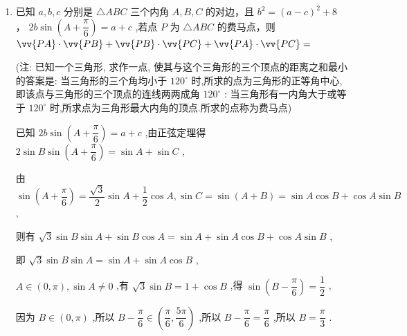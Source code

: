 \begin{enumerate}
\begin{jieda}
\begin{enumerate}
            又因为 ${9a} + {4c} = {25}$ ,
            
            则 $\dfrac{\sqrt{3}}{BD} = \dfrac{1}{25}\left( {{9a} + {4c}}\right) \left( {\dfrac{1}{a} + \dfrac{1}{c}}\right)  = \dfrac{1}{25}\left( {{13} + \dfrac{4c}{a} + \dfrac{9a}{c}}\right)  \geq  \dfrac{1}{25}\left( {{13} + 2\sqrt{\dfrac{4c}{a} \cdot  \dfrac{9a}{c}}}\right)  = 1$ ,
            
            当且仅当 $\dfrac{4c}{a} = \dfrac{9a}{c}$ ,即 $a = \dfrac{5}{3},c = \dfrac{5}{2}$ 时取等号,
            
            可得 ${BD} \leq  \sqrt{3}$ ，所以 ${BD}$ 的最大值为 $\sqrt{3}$ .
        \end{enumerate}
    \end{jieda}
    \item 已知 $a,b,c$ 分别是 $\bigtriangleup  {ABC}$ 三个内角 $A,B,C$ 的对边，且 ${b}^{2} = {\left( a - c\right) }^{2} + 8$ ， ${2b}\sin \left( {A + \dfrac{\pi }{6}}\right)  = a + c$ ,若点 $P$ 为 $\bigtriangleup  {ABC}$ 的费马点，则 $\vv{PA} \cdot  \vv{PB} + \vv{PB} \cdot  \vv{PC} + \vv{PA} \cdot  \vv{PC} =$
    
    (注: 已知一个三角形, 求作一点, 使其与这个三角形的三个顶点的距离之和最小的答案是: 当三角形的三个角均小于 ${120}^{ \circ  }$ 时,所求的点为三角形的正等角中心,即该点与三角形的三个顶点的连线两两成角 ${120}^{ \circ  }$ : 当三角形有一内角大于或等于 ${120}^{ \circ  }$ 时,所求点为三角形最大内角的顶点.所求的点称为费马点)
    \begin{jieda}
        已知 ${2b}\sin \left( {A + \dfrac{\pi }{6}}\right)  = a + c$ ,由正弦定理得 $2\sin B\sin \left( {A + \dfrac{\pi }{6}}\right)  = \sin A + \sin C$ ,
        
        由 $\sin \left( {A + \dfrac{\pi }{6}}\right)  = \dfrac{\sqrt{3}}{2}\sin A + \dfrac{1}{2}\cos A,\sin C = \sin \left( {A + B}\right)  = \sin A\cos B + \cos A\sin B$ ,
        
        则有 $\sqrt{3}\sin B\sin A + \sin B\cos A = \sin A + \sin A\cos B + \cos A\sin B$ ,
        
        即 $\sqrt{3}\sin B\sin A = \sin A + \sin A\cos B$ ,
        
        $A \in  \left( {0,\pi }\right) ,\sin A \neq  0$ ,有 $\sqrt{3}\sin B = 1 + \cos B$ ,得 $\sin \left( {B - \dfrac{\pi }{6}}\right)  = \dfrac{1}{2}$ ,
        
        因为 $B \in  \left( {0,\pi }\right)$ ,所以 $B - \dfrac{\pi }{6} \in  \left( {\dfrac{\pi }{6},\dfrac{5\pi }{6}}\right)$ ,所以 $B - \dfrac{\pi }{6} = \dfrac{\pi }{6}$ ,所以 $B = \dfrac{\pi }{3}$ .
        

\end{jieda}
\end{enumerate}
